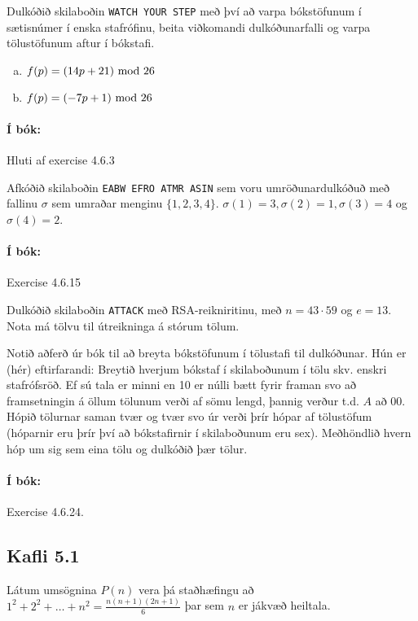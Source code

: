 \documentclass{exam}
\begin{document}
\begin{questions}

\question Dulkóðið skilaboðin \texttt{WATCH YOUR STEP} með því að varpa bókstöfunum í sætisnúmer í enska stafrófinu, beita viðkomandi dulkóðunarfalli og varpa tölustöfunum aftur í bókstafi.

\begin{enumerate}[a)]
 \item $f(p) = (14p + 21) \ \text{mod}\ 26$
 \item $f(p) = (-7p + 1) \ \text{mod}\ 26$
\end{enumerate}
\paragraph{Í bók:} Hluti af exercise 4.6.3

\question Afkóðið skilaboðin \texttt{EABW EFRO ATMR ASIN} sem voru umröðunardulkóðuð með fallinu $\sigma$ sem umraðar menginu $\{1,2,3,4\}$. $\sigma(1) = 3, \sigma(2) = 1, \sigma(3) = 4$ og $\sigma(4) = 2$.

\paragraph{Í bók:} Exercise 4.6.15

\question Dulkóðið skilaboðin \texttt{ATTACK} með RSA-reikniritinu, með $n = 43\cdot 59$ og $e=13$. Nota má tölvu til útreikninga á stórum tölum.

Notið aðferð úr bók til að breyta bókstöfunum í tölustafi til dulkóðunar. Hún er (hér) eftirfarandi: Breytið hverjum bókstaf í skilaboðunum í tölu skv. enskri stafrófsröð. Ef sú tala er minni en 10 er núlli bætt fyrir framan svo að framsetningin á öllum tölunum verði af sömu lengd, þannig verður t.d. $A$ að $00$. Hópið tölurnar saman tvær og tvær svo úr verði þrír hópar af tölustöfum (hóparnir eru þrír því að bókstafirnir í skilaboðunum eru sex). Meðhöndlið hvern hóp um sig sem eina tölu og dulkóðið þær tölur.

\paragraph{Í bók:} Exercise 4.6.24.

\subsection{Kafli 5.1}

\question Látum umsögnina $P(n)$ vera þá staðhæfingu að $1^2 + 2^2 + \ldots + n^2 = \frac{n(n+1)(2n+1)}{6}$ þar sem $n$ er jákvæð heiltala.


\end{questions}
\end{document}
